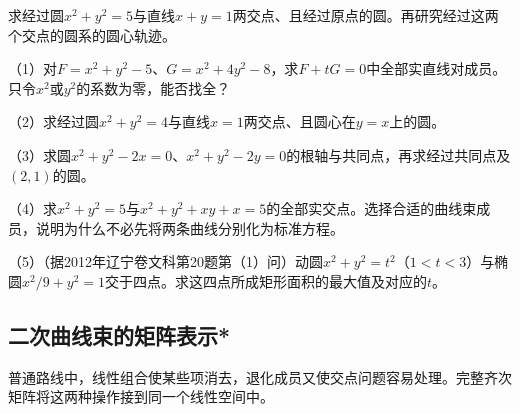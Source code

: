 \par\noindent\begin{minipage}{\linewidth}
\begin{example}
求经过圆\(x^2+y^2=5\)与直线\(x+y=1\)两交点、且经过原点的圆。再研究经过这两个交点的圆系的圆心轨迹。
\end{example}
\end{minipage}\par


\begin{exercise}
\mbox{}\par\nobreak

\begin{samepage}
（1）对\(F=x^2+y^2-5\)、\(G=x^2+4y^2-8\)，求\(F+tG=0\)中全部实直线对成员。只令\(x^2\)或\(y^2\)的系数为零，能否找全？
\par
\end{samepage}

\begin{samepage}
（2）求经过圆\(x^2+y^2=4\)与直线\(x=1\)两交点、且圆心在\(y=x\)上的圆。
\par
\end{samepage}

\begin{samepage}
（3）求圆\(x^2+y^2-2x=0\)、\(x^2+y^2-2y=0\)的根轴与共同点，再求经过共同点及\((2,1)\)的圆。
\par
\end{samepage}

\begin{samepage}
（4）求\(x^2+y^2=5\)与\(x^2+y^2+xy+x=5\)的全部实交点。选择合适的曲线束成员，说明为什么不必先将两条曲线分别化为标准方程。
\par
\end{samepage}

\begin{samepage}
（5）（据2012年辽宁卷文科第20题第（1）问）动圆\(x^2+y^2=t^2\)（\(1<t<3\)）与椭圆\(x^2/9+y^2=1\)交于四点。求这四点所成矩形面积的最大值及对应的\(t\)。
\par
\end{samepage}

\end{exercise}

\newpage
\subsection{二次曲线束的矩阵表示*}
\label{subsec:quadratic-conic-pencil-matrices}

普通路线中，线性组合使某些项消去，退化成员又使交点问题容易处理。完整齐次矩阵将这两种操作接到同一个线性空间中。

